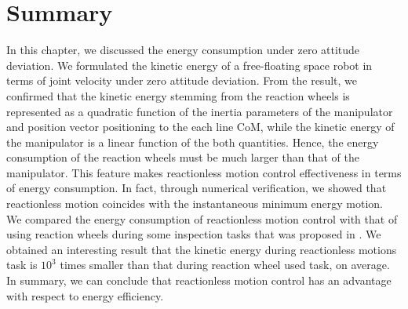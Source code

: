 \section{Summary}
In this chapter, we discussed the energy consumption under zero attitude deviation.
We formulated the kinetic energy of a free-floating space robot in terms of
joint velocity under zero attitude deviation.
From the result,
we confirmed that the kinetic energy stemming from the reaction wheels is represented
as a quadratic function of the inertia parameters of the manipulator
and position vector positioning to the each line CoM,
while the kinetic energy of the manipulator is a linear function of the both quantities.
Hence, the energy consumption of the reaction wheels must be much larger than that of the manipulator.
This feature makes reactionless motion control effectiveness in terms of energy consumption.
In fact, through numerical verification,
we showed that reactionless motion coincides with the instantaneous minimum energy motion.
We compared the energy consumption of reactionless motion control with that of using reaction wheels
during some inspection tasks that was proposed in .
We obtained an interesting result that the kinetic energy during reactionless motions task
is $10^{3}$ times smaller than that during reaction wheel used task, on average.
In summary,
we can conclude that reactionless motion control has an advantage
with respect to energy efficiency.






%
%
